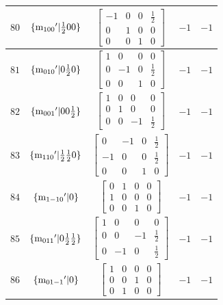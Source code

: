 \documentclass[fleqn,8pt]{jsarticle}
\begin{document}
\begin{longtable}{ccccc}
$ 80 $ & $ \{{\rm m}_{100}{}'|\frac{1}{2} 0 0\} $ & $ \begin{bmatrix} -1 & 0 & 0 & \frac{1}{2} \\ 0 & 1 & 0 & 0 \\ 0 & 0 & 1 & 0 \end{bmatrix} $ & $ -1 $ & $ -1 $ \\ \hline
$ 81 $ & $ \{{\rm m}_{010}{}'|0 \frac{1}{2} 0\} $ & $ \begin{bmatrix} 1 & 0 & 0 & 0 \\ 0 & -1 & 0 & \frac{1}{2} \\ 0 & 0 & 1 & 0 \end{bmatrix} $ & $ -1 $ & $ -1 $ \\ \hline
$ 82 $ & $ \{{\rm m}_{001}{}'|0 0 \frac{1}{2}\} $ & $ \begin{bmatrix} 1 & 0 & 0 & 0 \\ 0 & 1 & 0 & 0 \\ 0 & 0 & -1 & \frac{1}{2} \end{bmatrix} $ & $ -1 $ & $ -1 $ \\ \hline
$ 83 $ & $ \{{\rm m}_{110}{}'|\frac{1}{2} \frac{1}{2} 0\} $ & $ \begin{bmatrix} 0 & -1 & 0 & \frac{1}{2} \\ -1 & 0 & 0 & \frac{1}{2} \\ 0 & 0 & 1 & 0 \end{bmatrix} $ & $ -1 $ & $ -1 $ \\ \hline
$ 84 $ & $ \{{\rm m}_{1-10}{}'|0\} $ & $ \begin{bmatrix} 0 & 1 & 0 & 0 \\ 1 & 0 & 0 & 0 \\ 0 & 0 & 1 & 0 \end{bmatrix} $ & $ -1 $ & $ -1 $ \\ \hline
$ 85 $ & $ \{{\rm m}_{011}{}'|0 \frac{1}{2} \frac{1}{2}\} $ & $ \begin{bmatrix} 1 & 0 & 0 & 0 \\ 0 & 0 & -1 & \frac{1}{2} \\ 0 & -1 & 0 & \frac{1}{2} \end{bmatrix} $ & $ -1 $ & $ -1 $ \\ \hline
$ 86 $ & $ \{{\rm m}_{01-1}{}'|0\} $ & $ \begin{bmatrix} 1 & 0 & 0 & 0 \\ 0 & 0 & 1 & 0 \\ 0 & 1 & 0 & 0 \end{bmatrix} $ & $ -1 $ & $ -1 $ \\ \hline

\end{longtable}
\end{document}
